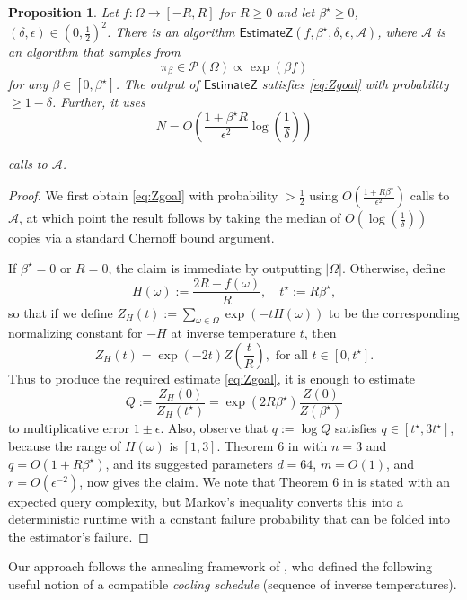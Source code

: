 \documentclass[11pt]{article}
\newtheorem{proposition}{Proposition}
\newcommand{\defeq}{:=}
\newcommand{\eps}{\epsilon}
\newcommand{\half}{\frac{1}{2}}
\newcommand{\1}{\mathbf{1}}
\newcommand{\0}{\mathbf{0}}
\newcommand{\Par}[1]{\left(#1\right)}
\newcommand{\alg}{\mathcal{A}}
\newcommand{\calA}{{\mathcal{A}}}
\newcommand{\calP}{{\mathcal{P}}}
\newcommand{\EstZ}{\mathsf{EstimateZ}}
\begin{document}
\begin{proposition}\label{prop:adaptive_sche_range_f}
Let $f: \Omega \to [-R, R]$ for $R \ge 0$ and let $\beta^\star \ge 0$, $(\delta, \eps) \in (0, \half)^2$. There is an algorithm $\EstZ(f, \beta^\star, \delta, \eps, \calA)$, where $\calA$ is an algorithm that samples from
\[\pi_\beta \in \calP(\Omega) \propto \exp\Par{\beta f}\]
for any $\beta \in [0, \beta^\star]$. The output of $\EstZ$ satisfies \eqref{eq:Zgoal} with probability $\ge 1 - \delta$. Further, it uses 
\begin{equation}
    \label{eq:sample_complexity_est_const}
    N = O\Par{\frac{1 + \beta^\star R}{\eps^2}\log\Par{\frac 1 \delta}}
\end{equation}

calls to $\alg$.
\end{proposition}
\begin{proof}
We first obtain \eqref{eq:Zgoal} with probability $> \half$ using $O(\frac{1 + R\beta^\star}{\eps^2})$ calls to $\calA$, at which point the result follows by taking the median of $O(\log(\frac 1 \delta))$ copies via a standard Chernoff bound argument.

If $\beta^\star = 0$ or $R = 0$, the claim is immediate by outputting $|\Omega|$. Otherwise, define
\[H(\omega) \defeq \frac{2R-f(\omega)}{R},\quad t^\star \defeq R\beta^\star,\]
so that if we define $Z_H(t) \defeq \sum_{\omega \in \Omega} \exp(-tH(\omega))$ to be the corresponding normalizing constant for $-H$ at inverse temperature $t$, then
\[Z_H(t) = \exp\Par{-2t}Z\Par{\frac t R},\text{ for all } t \in [0, t^\star].\]
Thus to produce the required estimate \eqref{eq:Zgoal}, it is enough to estimate
\[Q \defeq \frac{Z_H(0)}{Z_H(t^\star)} = \exp\Par{2R\beta^\star} \frac{Z(0)}{Z(\beta^\star)}\]
to multiplicative error $1 \pm \eps$. Also, observe that $q \defeq \log Q$ satisfies $q \in [t^\star, 3t^\star]$, because the range of $H(\omega)$ is $[1, 3]$. Theorem 6 in \cite{Kolmogorov18} with $n = 3$ and $q = O(1 + R\beta^\star)$, and its suggested parameters $d = 64$, $m = O(1)$, and $r = O(\eps^{-2})$, now gives the claim. We note that Theorem 6 in \cite{Kolmogorov18} is stated with an expected query complexity, but Markov's inequality converts this into a deterministic runtime with a constant failure probability that can be folded into the estimator's failure.
\end{proof}

\iffalse
Our approach follows the annealing framework of \cite{dyer1991computing, StefankovicVV09}, who defined the following useful notion of a compatible \emph{cooling schedule} (sequence of inverse temperatures).
\end{document}
